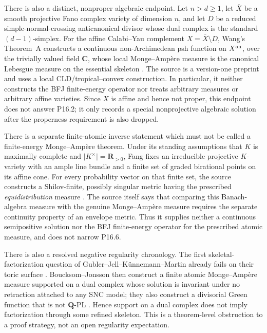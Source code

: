 \documentclass[11pt,a4paper]{article}
\theoremstyle{definition}
\theoremstyle{remark}
\renewcommand{\index}[1]{}
\begin{document}
There is also a distinct, nonproper algebraic endpoint.  Let \(n>d\geq1\),
let \(\overline X\) be a smooth projective Fano complex variety of dimension
\(n\), and let \(D\) be a reduced simple-normal-crossing anticanonical
divisor whose dual complex is the standard \((d-1)\)-simplex.  For the
affine Calabi--Yau complement \(X=\overline X\setminus D\), Wang's
Theorem~A constructs a continuous non-Archimedean psh function on
\(X^{\mathrm{an}}\), over the trivially valued field \(\mathbf C\), whose local
Monge--Amp\`ere measure is the canonical Lebesgue measure on the essential
skeleton \cite{Wang25NACalabiYau}.  The source is a version-one preprint and
uses a local CLD/tropical--convex construction.  In particular, it neither
constructs the BFJ finite-energy operator nor treats arbitrary measures or
arbitrary affine varieties.  Since \(X\) is affine and hence not proper,
this endpoint does not answer P16.2; it only records a special nonprojective
algebraic solution after the properness requirement is also dropped.

There is a separate finite-atomic inverse statement which must not be
called a finite-energy Monge--Amp\`ere theorem.  Under its standing
assumptions that \(K\) is maximally complete and
\(\lvert K^\times\rvert=\mathbf R_{>0}\), Fang fixes an irreducible
projective \(K\)-variety with an ample line bundle and a finite set of graded
birational points on its affine cone.  For every probability vector on that
finite set, the source constructs a Shilov-finite, possibly singular metric
having the prescribed \emph{equidistribution} measure
\cite[Proposition~4.8]{Fang25Shilov}.  The source itself says that comparing
this Banach-algebra measure with the genuine Monge--Amp\`ere measure requires
the separate continuity property of an envelope metric.  Thus it supplies
neither a continuous semipositive solution nor the BFJ finite-energy operator
for the prescribed atomic measure, and does not narrow P16.6.

\index{Monge--Amp\`ere equation!skeletal factorization}
There is also a resolved negative regularity chronology.  The first
skeletal-factorization question of Gubler--Jell--K\"unnemann--Martin already
fails on their toric surface \cite[Appendix~A]{GJKM19}.
Boucksom--Jonsson then construct a finite
atomic Monge--Amp\`ere measure supported on a dual complex whose solution is
invariant under no retraction attached to any SNC model; they also construct
a divisorial Green function that is not \(\mathbf Q\)-PL
\cite[Theorems~A and~B]{BJGreen24}.  Hence support on a dual complex does not
imply factorization through some refined skeleton.  This is a theorem-level
obstruction to a proof strategy, not an open regularity expectation.
\end{document}
